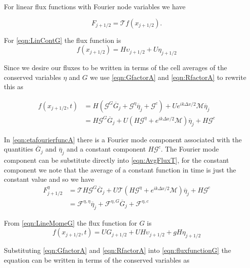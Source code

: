 For linear flux functions with Fourier node variables we have

\begin{equation}
F_{j+1/2} = \mathcal{T}f(x_{j+1/2}).
\label{eqn:AvgFluxT}
\end{equation}

For \eqref{eqn:LinContG} the flux function is
\begin{equation}
f(x_{j+1/2}) = H\upsilon_{j+1/2} + U \eta_{j+1/2}
\label{eqn:fluxfunctioneta}
\end{equation} 

Since we desire our fluxes to be written in terms of the cell averages of the conserved variables $\eta$ and $G$ we use \eqref{eqn:GfactorA} and \eqref{eqn:RfactorA} to rewrite this as

\begin{align}
f(x_{j+1/2},t) &= H\left(\mathcal{G}^G \overline{G}_j + \mathcal{G}^\eta \overline{\eta}_j + \mathcal{G}^c\right) + U e^{i {k\Delta x}/{2}}\mathcal{M} \overline{\eta}_j \nonumber \\ &= H\mathcal{G}^G \overline{G}_j + U\left(H\mathcal{G}^\eta + e^{i {k\Delta x}/{2}}\mathcal{M} \right) \overline{\eta}_j + H\mathcal{G}^c 
\label{eqn:etafourierfuncA}
\end{align}

In \eqref{eqn:etafourierfuncA} there is a Fourier mode component associated with the quantities $\overline{G}_j$ and $\overline{\eta}_j$ and a constant component $H\mathcal{G}^c $. The Fourier mode component can be substitute directly into \eqref{eqn:AvgFluxT}, for the constant component we note that the average of a constant function in time  is just the constant value and so we have
\begin{align}
F^\eta_{j+1/2} &= \mathcal{T} H\mathcal{G}^G \overline{G}_j + U \mathcal{T} \left(H\mathcal{G}^\eta + e^{i {k\Delta x}/{2}}\mathcal{M} \right) \overline{\eta}_j + H\mathcal{G}^c \nonumber \\ 
& =\mathcal{F}^{\eta,\eta}\overline{\eta}_j + \mathcal{F}^{\eta,G}\overline{G}_j + \mathcal{F}^{\eta,c}
\label{eqn:FfactorsetaA}
\end{align}


From \eqref{eqn:LineMomeG} the flux function for $G$ is
\begin{equation}
f(x_{j+1/2},t) = UG_{j+1/2} + UH \upsilon_{j+1/2} + gH \eta_{j+1/2}
\label{eqn:fluxfunctionG}
\end{equation}

Substituting \eqref{eqn:GfactorA} and \eqref{eqn:RfactorA} into \eqref{eqn:fluxfunctionG} the equation can be written in terms of the conserved variables as

